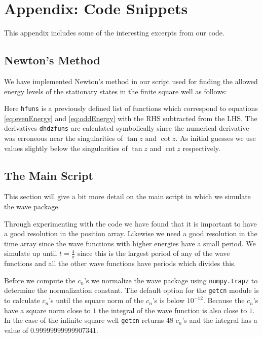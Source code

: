 \documentclass[12pt,a4paper]{article}
\begin{document}
\newpage
\appendix
\section{Appendix: Code Snippets}
This appendix includes some of the interesting excerpts from our code.
\subsection{Newton's Method} \label{app:newton}
We have implemented Newton's method in our script used for finding the allowed energy levels of the stationary states in the finite square well as follows:

Here \lstinline{hfuns} is a previously defined list of functions which correspond to equations \eqref{eq:evenEnergy} and \eqref{eq:oddEnergy} with the RHS subtracted from the LHS. The derivatives \lstinline{dhdzfuns} are calculated symbolically since the numerical derivative was erroneous near the singularities of $\tan z$ and $\cot z$. As initial guesses we use values slightly below the singularities of $\tan z$ and $\cot z$ respectively.

\subsection{The Main Script}
This section will give a bit more detail on the main script in which we simulate the wave package.



Through experimenting with the code we have found that it is important to have a good resolution in the position array. Likewise we need a good resolution in the time array since the wave functions with higher energies have a small period. We simulate up until $t = \frac{4}{\pi}$ since this is the largest period of any of the wave functions and all the other wave functions have periods which divides this.



Before we compute the $c_n$'s we normalize the wave package using \lstinline{numpy.trapz} to determine the normalization constant. The default option for the \verb!getcn! module is to calculate $c_n$'s until the square norm of the $c_n$'s is below $10^{-12}$. Because the $c_n$'s have a square norm close to $1$ the integral of the wave function is also close to $1$. In the case of the infinite square well \lstinline{getcn} returns 48 $c_n$'s and the integral has a value of $0.99999999999907341$.
\end{document}

